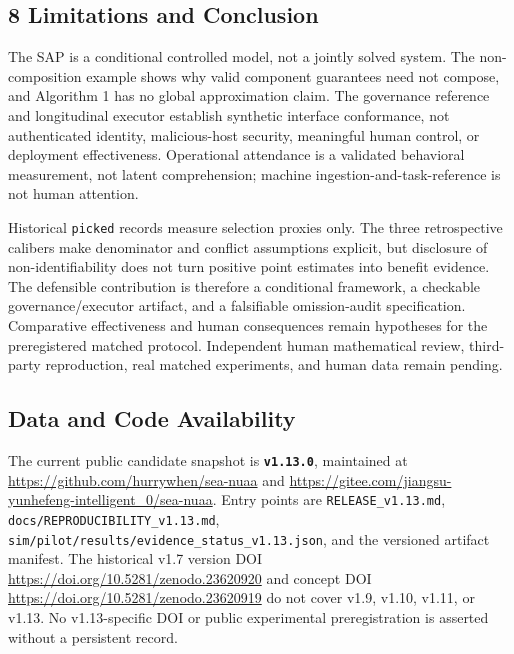 \documentclass[
  11pt]{article}
\begin{document}
\subsection{8 Limitations and
Conclusion}\label{limitations-and-conclusion}

The SAP is a conditional controlled model, not a jointly solved system.
The non-composition example shows why valid component guarantees need
not compose, and Algorithm 1 has no global approximation claim. The
governance reference and longitudinal executor establish synthetic
interface conformance, not authenticated identity, malicious-host
security, meaningful human control, or deployment effectiveness.
Operational attendance is a validated behavioral measurement, not latent
comprehension; machine ingestion-and-task-reference is not human
attention.

Historical \texttt{picked} records measure selection proxies only. The
three retrospective calibers make denominator and conflict assumptions
explicit, but disclosure of non-identifiability does not turn positive
point estimates into benefit evidence. The defensible contribution is
therefore a conditional framework, a checkable governance/executor
artifact, and a falsifiable omission-audit specification. Comparative
effectiveness and human consequences remain hypotheses for the
preregistered matched protocol. Independent human mathematical review,
third-party reproduction, real matched experiments, and human data
remain pending.

\subsection{Data and Code
Availability}\label{data-and-code-availability}

The current public candidate snapshot is \textbf{\texttt{v1.13.0}},
maintained at \url{https://github.com/hurrywhen/sea-nuaa} and
\url{https://gitee.com/jiangsu-yunhefeng-intelligent_0/sea-nuaa}. Entry
points are \texttt{RELEASE\_v1.13.md},
\texttt{docs/REPRODUCIBILITY\_v1.13.md},
\texttt{sim/pilot/results/evidence\_status\_v1.13.json}, and the
versioned artifact manifest. The historical v1.7 version DOI
\url{https://doi.org/10.5281/zenodo.23620920} and concept DOI
\url{https://doi.org/10.5281/zenodo.23620919} do not cover v1.9, v1.10,
v1.11, or v1.13. No v1.13-specific DOI or public experimental
preregistration is asserted without a persistent record.
\end{document}
